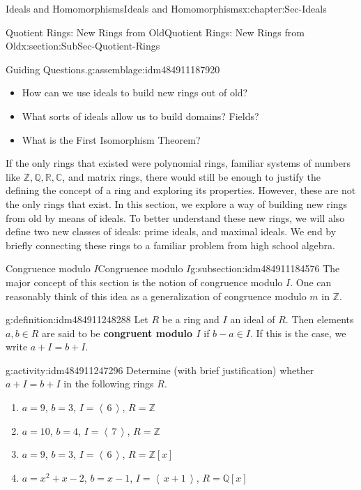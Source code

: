 \documentclass[oneside,10pt,]{book}
\newcommand{\terminology}[1]{\textbf{#1}}
\numberwithin{equation}{section}
\newcommand{\ideal}[1]{\left\langle\, #1 \,\right\rangle}
\def\C{{\mathbb C}}
\def\Z{{\mathbb Z}}
\def\Q{{\mathbb Q}}
\def\R{{\mathbb R}}
\begin{document}
\begin{chapterptx}{Ideals and Homomorphisms}{}{Ideals and Homomorphisms}{}{}{x:chapter:Sec-Ideals}
\begin{sectionptx}{Quotient Rings: New Rings from Old}{}{Quotient Rings: New Rings from Old}{}{}{x:section:SubSec-Quotient-Rings}
\begin{assemblage}{Guiding Questions.}{g:assemblage:idm484911187920}
\begin{itemize}[label=\textbullet]
\item{}How can we use ideals to build new rings out of old?%
\item{}What sorts of ideals allow us to build domains? Fields?%
\item{}What is the First Isomorphism Theorem?%
\end{itemize}
%
\end{assemblage}
\begin{introduction}{}%
If the only rings that existed were polynomial rings, familiar systems of numbers like \(\Z, \Q, \R, \C\), and matrix rings, there would still be enough to justify the defining the concept of a ring and exploring its properties. However, these are not the only rings that exist. In this section, we explore a way of building new rings from old by means of ideals. To better understand these new rings, we will also define two new classes of ideals: prime ideals, and maximal ideals. We end by briefly connecting these rings to a familiar problem from high school algebra.%
\end{introduction}%
%
%
\typeout{************************************************}
\typeout{************************************************}
%
\begin{subsectionptx}{Congruence modulo \(I\)}{}{Congruence modulo \(I\)}{}{}{g:subsection:idm484911184576}
The major concept of this section is the notion of congruence modulo \(I\). One can reasonably think of this idea as a generalization of congruence modulo \(m\) in \(\Z\).%
\begin{definition}{}{g:definition:idm484911248288}%
%
Let \(R\) be a ring and \(I\) an ideal of \(R\). Then elements \(a,b\in R\) are said to be \terminology{congruent modulo \(I\)} if \(b-a\in I\). If this is the case, we write \(a + I = b + I\).%
\end{definition}
\begin{activity}{}{g:activity:idm484911247296}%
Determine (with brief justification) whether \(a + I = b + I\) in the following rings \(R\).%
%
\begin{enumerate}
\item{}\(a = 9\), \(b = 3\), \(I = \ideal{6}\), \(R = \Z\)%
\item{}\(a = 10\), \(b = 4\), \(I = \ideal{7}\), \(R = \Z\)%
\item{}\(a = 9\), \(b = 3\), \(I = \ideal{6}\), \(R = \Z[x]\)%
\item{}\(a = x^2+x-2\), \(b = x-1\), \(I = \ideal{x+1}\), \(R = \Q[x]\)%

\end{enumerate}
\end{activity}
\end{subsectionptx}
\end{sectionptx}
\end{chapterptx}
\end{document}
